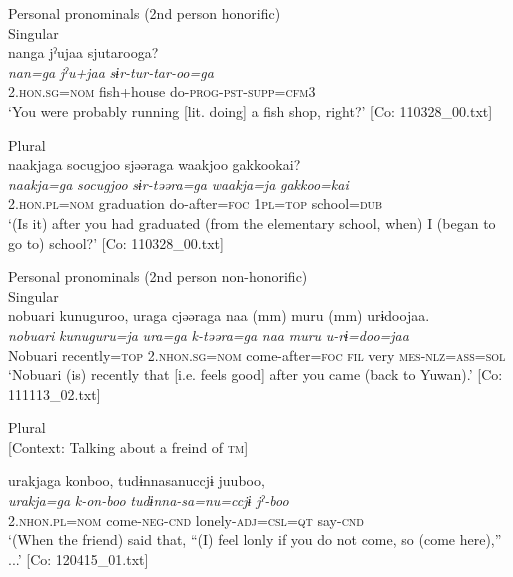 Personal pronominals (2nd person honorific)\\

\ex Singular\\
{\TM}
\glll  nanga  jˀujaa  sjutarooga?\\
\textit{nan=ga}  \textit{jˀu+jaa}  \textit{sɨr-tur-tar-oo=ga}\\
2.\textsc{hon}.\textsc{sg}=\textsc{nom}  fish+house  do-\textsc{prog}-\textsc{pst}-\textsc{supp}=\textsc{cfm}3\\
\glt ‘You were probably running [lit. doing] a fish shop, right?’ [Co: 110328\_00.txt]
\z

\ex Plural\\
{\TM}
\glll  naakjaga  {\textbar}socugjoo{\textbar}  sjəəraga  waakjoo  {\textbar}gakkoo{\textbar}kai?\\
\textit{naakja=ga}  \textit{socugjoo}  \textit{sɨr-təəra=ga}  \textit{waakja=ja}  \textit{gakkoo=kai}\\
2.\textsc{hon}.\textsc{pl}=\textsc{nom}  graduation  do-after=\textsc{foc}  1\textsc{pl}=\textsc{top}  school=\textsc{dub}\\
\glt ‘(Is it) after you had graduated (from the elementary school, when) I (began to go to) school?’ [Co: 110328\_00.txt]
\z

Personal pronominals (2nd person non-honorific)\\

\ex Singular\\
{\TM}
\glll  nobuari  kunuguroo,  uraga  cjəəraga    naa  (mm)  muru  (mm)  urɨdoojaa.\\
\textit{nobuari}  \textit{kunuguru=ja}  \textit{ura=ga}  \textit{k-təəra=ga}    \textit{naa}    \textit{muru}    \textit{u-rɨ=doo=jaa}\\
Nobuari  recently=\textsc{top}  2.\textsc{nhon}.\textsc{sg}=\textsc{nom}  come-after=\textsc{foc}  \textsc{fil}    very    \textsc{mes}-\textsc{nlz}=\textsc{ass}=\textsc{sol}\\
\glt ‘Nobuari (is) recently that [i.e. feels good] after you came (back to Yuwan).’ [Co: 111113\_02.txt]
\z

\ex  Plural\\{}
    [Context: Talking about a freind of \textsc{tm}]

{\TM}
\glll urakjaga  konboo,  tudɨnnasanuccjɨ  juuboo,\\
      \textit{urakja=ga}  \textit{k-on-boo}  \textit{tudɨnna-sa=nu=ccjɨ}  \textit{jˀ-boo}\\
      2.\textsc{nhon}.\textsc{pl}=\textsc{nom}  come-\textsc{neg}-\textsc{cnd}  lonely-\textsc{adj}=\textsc{csl}=\textsc{qt}  say-\textsc{cnd}\\
\glt ‘(When the friend) said that, “(I) feel lonly if you do not come, so (come here),” ...’ [Co: 120415\_01.txt]
\z

